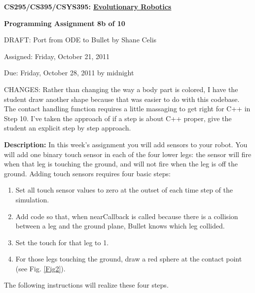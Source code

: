 \documentclass[12pt]{article}
\begin{document}
\centerline{\bf \Large CS295/CS395/CSYS395: \href{CS295_395_Syllabus.pdf}{\underline{Evolutionary Robotics}}}

\vspace{0.5cm}

\centerline{\bf \large Programming Assignment 8b of 10}
\vspace{0.25cm} \centerline{\color{red}DRAFT: Port from ODE to Bullet by Shane Celis \color{black}}
\vspace{0.5cm}

\centerline{\large Assigned: Friday, October 21, 2011}

\vspace{0.5cm}

\centerline{\large Due: Friday, October 28, 2011 by midnight}

\vspace{0.5cm}

\noindent \color{red}CHANGES: Rather than changing the way a body part is colored, I have the student draw another shape because that was easier to do with this codebase.  The contact handling function requires a little massaging to get right for C++ in Step 10.  I've taken the approach of if a step is about C++ proper, give the student an explicit step by step approach.  \color{black}

\noindent \textbf{Description:} In this week's assignment you will add sensors to your robot. You will add one binary touch sensor in each of the four lower legs: the sensor will fire when that leg is touching the ground, and will not fire when the leg is off the ground. Adding touch sensors requires four basic steps:

\begin{enumerate}

\item Set all touch sensor values to zero at the outset of each time step of the simulation.

\item Add code so that, when nearCallback is called because there is a collision between a leg and the ground plane, Bullet knows which leg collided.

\item Set the touch for that leg to 1.

\item For those legs touching the ground, draw a red sphere at the contact point  (see Fig. \ref{Fig2}).
\end{enumerate}


The following instructions will realize these four steps.
\end{document}
